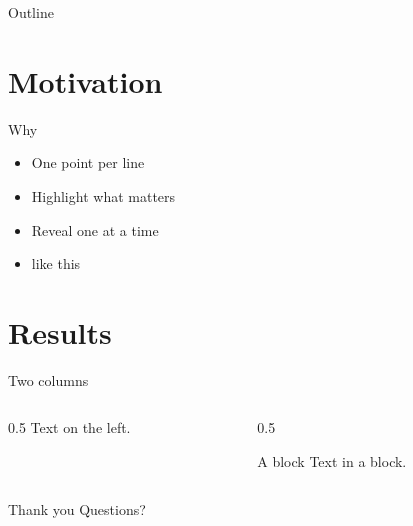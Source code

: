 \documentclass[aspectratio=169]{beamer}
\title{\doctitle}
\author{\docauthor}
\date{\today}
\begin{document}
\begin{frame}
  \titlepage
\end{frame}

\begin{frame}{Outline}
  \tableofcontents
\end{frame}

\section{Motivation}
\begin{frame}{Why}
  \begin{itemize}
    \item One point per line
    \item \alert{Highlight} what matters
    \item Reveal one at a time \pause
    \item like this
  \end{itemize}
\end{frame}

\section{Results}
\begin{frame}{Two columns}
  \begin{columns}
    \begin{column}{0.5\textwidth}
      Text on the left.
    \end{column}
    \begin{column}{0.5\textwidth}
      \begin{block}{A block}
        Text in a block.
      \end{block}
    \end{column}
  \end{columns}
\end{frame}

\begin{frame}{Thank you}
  Questions?
\end{frame}
\end{document}
